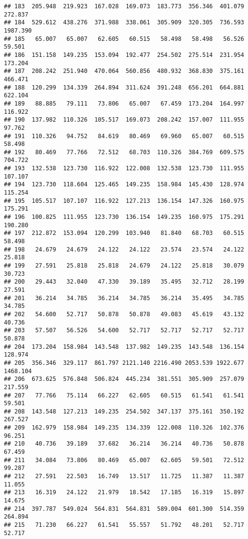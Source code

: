 \documentclass[
]{article}
\begin{document}
\begin{verbatim}
## 183  205.948  219.923  167.028  169.073  183.773  356.346  401.079  272.837
## 184  529.612  438.276  371.988  338.061  305.909  320.305  736.593 1987.390
## 185   65.007   65.007   62.605   60.515   58.498   58.498   56.526   59.501
## 186  151.158  149.235  153.094  192.477  254.502  275.514  231.954  173.204
## 187  208.242  251.940  470.064  560.856  480.932  368.830  375.161  466.471
## 188  120.299  134.339  264.894  311.624  391.248  656.201  664.881  622.104
## 189   88.885   79.111   73.806   65.007   67.459  173.204  164.997  116.922
## 190  137.982  110.326  105.517  169.073  208.242  157.007  111.955   97.762
## 191  110.326   94.752   84.619   80.469   69.960   65.007   60.515   58.498
## 192   80.469   77.766   72.512   68.703  110.326  384.769  609.575  704.722
## 193  132.538  123.730  116.922  122.008  132.538  123.730  111.955  107.107
## 194  123.730  118.604  125.465  149.235  158.984  145.430  128.974  115.254
## 195  105.517  107.107  116.922  127.213  136.154  147.326  160.975  175.291
## 196  100.825  111.955  123.730  136.154  149.235  160.975  175.291  190.280
## 197  212.872  153.094  120.299  103.940   81.840   68.703   60.515   58.498
## 198   24.679   24.679   24.122   24.122   23.574   23.574   24.122   25.818
## 199   27.591   25.818   25.818   24.679   24.122   25.818   30.079   30.723
## 200   29.443   32.040   47.330   39.189   35.495   32.712   28.199   27.591
## 201   36.214   34.785   36.214   34.785   36.214   35.495   34.785   34.785
## 202   54.600   52.717   50.878   50.878   49.083   45.619   43.132   40.736
## 203   57.507   56.526   54.600   52.717   52.717   52.717   52.717   50.878
## 204  173.204  158.984  143.548  137.982  149.235  143.548  136.154  128.974
## 205  356.346  329.117  861.797 2121.140 2216.490 2053.539 1922.677 1468.104
## 206  673.625  576.848  506.824  445.234  381.551  305.909  257.079  217.559
## 207   77.766   75.114   66.227   62.605   60.515   61.541   61.541   59.501
## 208  143.548  127.213  149.235  254.502  347.137  375.161  350.192  267.527
## 209  162.979  158.984  149.235  134.339  122.008  110.326  102.376   96.251
## 210   40.736   39.189   37.682   36.214   36.214   40.736   50.878   67.459
## 211   34.084   73.806   80.469   65.007   62.605   59.501   72.512   99.287
## 212   27.591   22.503   16.749   13.517   11.725   11.387   11.387   11.055
## 213   16.319   24.122   21.979   18.542   17.185   16.319   15.897   14.675
## 214  397.787  549.024  564.831  564.831  589.004  601.300  514.359  264.894
## 215   71.230   66.227   61.541   55.557   51.792   48.201   52.717   52.717

\end{verbatim}
\end{document}
